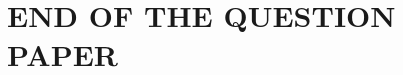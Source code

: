 \documentclass[a4paper,10pt]{article}
\begin{document}
\begin{enumerate}
\end{enumerate}

\centering
\section*{END OF THE QUESTION PAPER}
\end{document}
